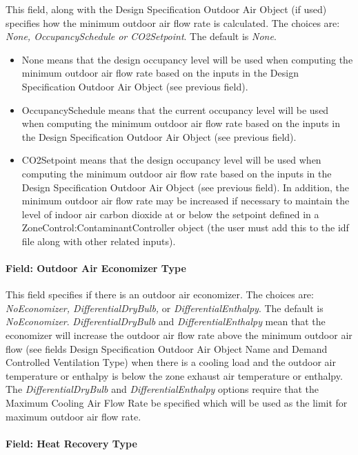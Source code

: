 This field, along with the Design Specification Outdoor Air Object (if used) specifies how the minimum outdoor air flow rate is calculated. The choices are: \emph{None, OccupancySchedule or CO2Setpoint}. The default is \emph{None}.

\begin{itemize}
\item
  None means that the design occupancy level will be used when computing the minimum outdoor air flow rate based on the inputs in the Design Specification Outdoor Air Object (see previous field).
\item
  OccupancySchedule means that the current occupancy level will be used when computing the minimum outdoor air flow rate based on the inputs in the Design Specification Outdoor Air Object (see previous field).
\item
  CO2Setpoint means that the design occupancy level will be used when computing the minimum outdoor air flow rate based on the inputs in the Design Specification Outdoor Air Object (see previous field). In addition, the minimum outdoor air flow rate may be increased if necessary to maintain the level of indoor air carbon dioxide at or below the setpoint defined in a ZoneControl:ContaminantController object (the user must add this to the idf file along with other related inputs).
\end{itemize}

\paragraph{Field: Outdoor Air Economizer Type}\label{field-outdoor-air-economizer-type}

This field specifies if there is an outdoor air economizer. The choices are: \emph{NoEconomizer, DifferentialDryBulb,} or \emph{DifferentialEnthalpy}. The default is \emph{NoEconomizer}. \emph{DifferentialDryBulb} and \emph{DifferentialEnthalpy} mean that the economizer will increase the outdoor air flow rate above the minimum outdoor air flow (see fields Design Specification Outdoor Air Object Name and Demand Controlled Ventilation Type) when there is a cooling load and the outdoor air temperature or enthalpy is below the zone exhaust air temperature or enthalpy. The \emph{DifferentialDryBulb} and \emph{DifferentialEnthalpy} options require that the Maximum Cooling Air Flow Rate be specified which will be used as the limit for maximum outdoor air flow rate.

\paragraph{Field: Heat Recovery Type}\label{field-heat-recovery-type}

